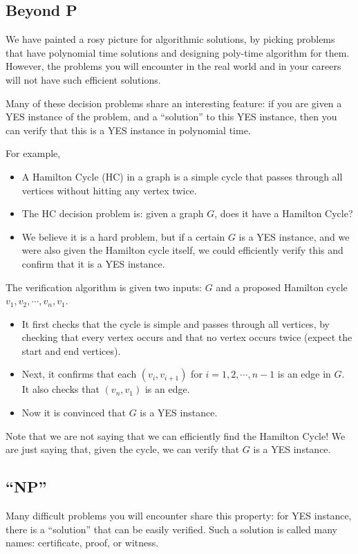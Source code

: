 \subsection{Beyond P}
We have painted a rosy picture for algorithmic solutions, by picking problems that have polynomial time solutions and designing poly-time algorithm for them. However, the problems you will encounter in the real world and in your careers will not have such efficient solutions. 

Many of these decision problems share an interesting feature: if you are given a YES instance of the problem, and a ``solution'' to this YES instance, then you can verify that this is a YES instance in polynomial time.

For example,
\begin{itemize}
	\item A Hamilton Cycle (HC) in a graph is a simple cycle that passes through all vertices without hitting any vertex twice.
	\item The HC decision problem is: given a graph $G$, does it have a Hamilton Cycle?
	\item We believe it is a hard problem, but if a certain $G$ is a YES instance, and we were also given the Hamilton cycle itself, we could efficiently verify this and confirm that it is a YES instance.
\end{itemize}

The verification algorithm is given two inputs: $G$ and a proposed Hamilton cycle $v_1, v_2, \cdots, v_n, v_1$.
\begin{itemize}
	\item It first checks that the cycle is simple and passes through all vertices, by checking that every vertex occurs and that no vertex occurs twice (expect the start and end vertices).
	\item Next, it confirms that each $(v_i, v_{i+1})$ for $i = 1, 2, \cdots, n-1$ is an edge in $G$. It also checks that $(v_n, v_1)$ is an edge.
	\item Now it is convinced that $G$ is a YES instance.
\end{itemize}
Note that we are not saying that we can efficiently find the Hamilton Cycle! We are just saying that, given the cycle, we can verify that $G$ is a YES instance.

\subsection{``NP''}
Many difficult problems you will encounter share this property: for YES instance, there is a ``solution'' that can be easily verified. Such a solution is called many names: certificate, proof, or witness.

